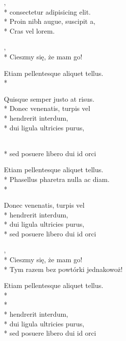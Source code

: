 \begin{lyrics}[multicol=true,longestline={Lorem Lorem Lorem Lorem Lorem}]
  ,\\*
  consectetur adipisicing elit.\\*
  Proin nibh augue, suscipit a,\\*
  Cras vel lorem.

  \begin{chorus}%
    ,\\*
    Cieszmy się, że mam go!
  \end{chorus}
  
  Etiam pellentesque aliquet tellus.\\*
  \begin{markverses}%
    Quisque semper justo at risus.\\*
    Donec venenatis, turpis vel\\*
    hendrerit interdum,\\*
    dui ligula ultricies purus,\end{markverses}\\*
  sed posuere libero dui id orci

  \chorusref

  Etiam pellentesque aliquet tellus.\\*
  Phasellus pharetra nulla ac diam.\\*
  \begin{markverses}[marktext={można też napisać co innego}]%
    Donec venenatis, turpis vel\\*
    hendrerit interdum,\\*
    dui ligula ultricies purus,\\*
    sed posuere libero dui id orci
  \end{markverses}

  \begin{chorus}[mark=false]%
    ,\\*
    Cieszmy się, że mam go! \\*
    Tym razem bez powtórki jednakowoż!
  \end{chorus}

  Etiam pellentesque aliquet tellus.\\*
  \\*
  \\*
  hendrerit interdum,\\*
  dui ligula ultricies purus,\\*
  sed posuere libero dui id orci

  \chorusref
\end{lyrics}
